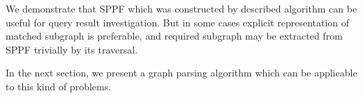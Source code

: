 We demonstrate that SPPF which was constructed by described algorithm can be useful for query result investigation. 
But in some cases explicit representation of matched subgraph is preferable, and required subgraph may be extracted from SPPF trivially by its traversal.

In the next section, we present a graph parsing algorithm  which can be applicable to this kind of problems.

